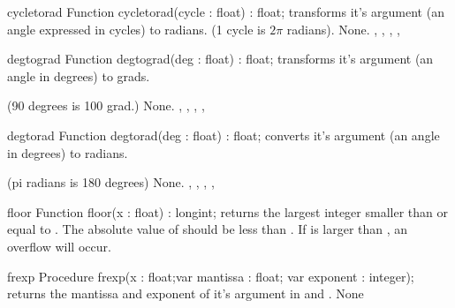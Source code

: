 

\begin{function}{cycletorad}
\Declaration
Function cycletorad(cycle : float) : float;
\Description
{} transforms it's argument 
(an angle expressed in cycles) to radians.
(1 cycle is $2 \pi$ radians).
\Errors
None.
\SeeAlso
{}, , ,
, 
\end{function}



\begin{function}{degtograd}
\Declaration
Function degtograd(deg : float) : float;
\Description
{} transforms it's argument  (an angle in degrees)
to grads.

(90 degrees is 100 grad.)
\Errors
None.
\SeeAlso
{}, , ,
, 
\end{function}



\begin{function}{degtorad}
\Declaration
Function degtorad(deg : float) : float;
\Description
{} converts it's argument  (an angle in degrees) to
radians.

(pi radians is 180 degrees)
\Errors
None.
\SeeAlso
{}, , ,
, 
\end{function}



\begin{function}{floor}
\Declaration
Function floor(x : float) : longint;
\Description
{} returns the largest integer smaller than or equal to .
The absolute value of  should be less than .
\Errors
If  is larger than , an overflow will occur.
\SeeAlso
{}
\end{function}



\begin{procedure}{frexp}
\Declaration
Procedure frexp(x : float;var mantissa : float; var exponent : integer);
\Description
{} returns the mantissa and exponent of it's argument
 in  and .
\Errors
None
\SeeAlso
\end{procedure}

